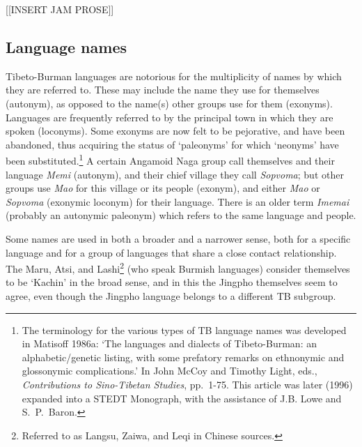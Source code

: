 [[INSERT JAM PROSE]]

\subsection{Language names}


Tibeto-Burman languages are notorious for the multiplicity of names by which
they are referred to. These may include the name they use for themselves
(autonym), as opposed to the name(s) other groups use for them (exonyms). 
Languages are frequently referred to by the principal town in which they are
spoken (loconyms).  Some exonyms are now felt to be pejorative, and have been
abandoned, thus acquiring the status of ‘paleonyms’ for which ‘neonyms’ have
been substituted.\footnote{The terminology for the various types of TB language
names was developed in Matisoff 1986a: ‘The languages and dialects of
Tibeto-Burman: an alphabetic/genetic listing, with some prefatory remarks on
ethnonymic and glossonymic complications.’  In John McCoy and Timothy Light,
eds., \textit{Contributions to Sino-Tibetan Studies},  pp.~1-75.  This article was later
(1996) expanded into a STEDT Monograph, with the assistance of J.B. Lowe and
S.\ P.\ Baron.}  A certain Angamoid Naga group call themselves and their language
\textit{Memi} (autonym), and their chief village they call \textit{Sopvoma};
but other groups use
\textit{Mao} for this village or its people (exonym), and either \textit{Mao}
or \textit{Sopvoma} (exonymic
loconym) for their language.  There is an older term \textit{Imemai} (probably an
autonymic paleonym) which refers to the same language and people.


Some names are used in both a broader and a narrower sense, both for a
specific language and for a group of languages that share a close contact
relationship.  The Maru, Atsi, and Lashi\footnote{Referred to as Langsu, Zaiwa,
and Leqi in Chinese sources.} (who speak Burmish languages) consider themselves
to be ‘Kachin’ in the broad sense, and in this the Jingpho themselves seem to
agree, even though the Jingpho language belongs to a different TB subgroup.


